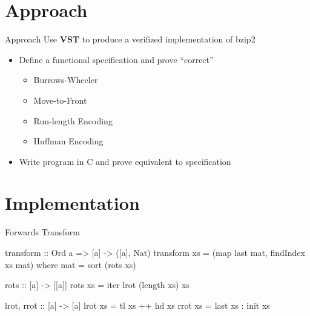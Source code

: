 \documentclass{beamer}
\begin{document}
  \section{Approach}
  \begin{frame}{Approach}
    Use \textbf{VST} to produce a verifized implementation of bzip2
    \begin{itemize}
    \item Define a functional specification and prove ``correct''
      \begin{itemize}
      \item \alert{Burrows-Wheeler}
      \item Move-to-Front
      \item Run-length Encoding
      \item Huffman Encoding
      \end{itemize}
    \item Write program in C and prove equivalent to specification
    \end{itemize}

  \end{frame}

  \section{Implementation}
  \begin{frame}[fragile]{Forwards Transform}
    \begin{semiverbatim}
transform    :: Ord a => [a] -> ([a], Nat)
transform xs = (map last mat, findIndex xs mat)
               where mat = sort (rots xs)

rots    :: [a] -> [[a]]
rots xs = iter lrot (length xs) xs

lrot, rrot :: [a] -> [a]
lrot xs = tl xs ++ hd xs
rrot xs = last xs : init xs
    \end{semiverbatim}
  \end{frame}
\end{document}
